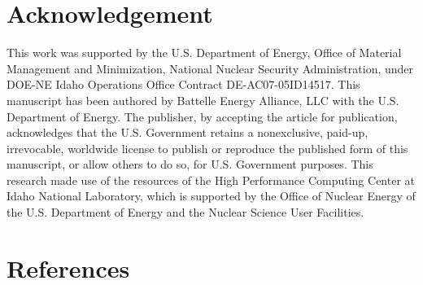 \documentclass[review]{elsarticle}
\providecommand{\DIFaddtex}[1]{{\protect\color{blue} \sf #1}} %
\providecommand{\DIFaddbegin}{} %
\providecommand{\DIFaddend}{} %
\providecommand{\DIFadd}[1]{\texorpdfstring{\DIFaddtex{#1}}{#1}} %
\newcommand{\DIFaddincludegraphics}[2][]{{\color{blue}\fbox{\DIFOincludegraphics[#1]{#2}}}} %
\DeclareRobustCommand{\DIFaddbegin}{\DIFOaddbegin \let\includegraphics\DIFaddincludegraphics} %
\DeclareRobustCommand{\DIFaddend}{\DIFOaddend \let\includegraphics\DIFOincludegraphics} %
\begin{document}
\section{Acknowledgement}
This work was supported by the U.S. Department of Energy, Office of Material Management and Minimization, National Nuclear Security Administration, under DOE-NE Idaho Operations Office Contract DE-AC07-05ID14517. This manuscript has been authored by Battelle Energy Alliance, LLC with the U.S. Department of Energy. The publisher, by accepting the article for publication, acknowledges that the U.S. Government retains a nonexclusive, paid-up, irrevocable, worldwide license to publish or reproduce the published form of this manuscript, or allow others to do so, for U.S. Government purposes. This research made use of the resources of the High Performance Computing Center at Idaho National Laboratory, which is supported by the Office of Nuclear Energy of the U.S. Department of Energy and the Nuclear Science User Facilities.
\DIFaddbegin 

\section{\DIFadd{References}}
\DIFaddend 


\end{document}
